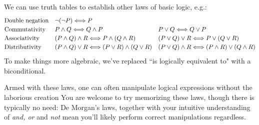 \begin{aside}{}{}
	\label{pg:asidelogicalgebra}
	
	We can use truth tables to establish other laws of basic logic, e.g.:
	\[
		\def\arraystretch{1.2}
		\begin{array}{@{}lll@{}}
			\text{Double negation} & \neg(\neg P)\Longleftrightarrow P &\\
			\text{Commutativity} & P\wedge Q\Longleftrightarrow Q\wedge P & P\vee Q\Longleftrightarrow Q\vee P\\
			\text{Associativity} & (P\wedge Q)\wedge R\Longleftrightarrow P\wedge(Q\wedge R) & (P\vee Q)\vee R\Longleftrightarrow P\vee(Q\vee R)\\
			\text{Distributivity}&(P\wedge Q)\vee R\Longleftrightarrow (P\vee R)\wedge (Q\vee R) & (P\vee Q)\wedge R\Longleftrightarrow (P\wedge R)\vee (Q\wedge R)
		\end{array}
	\]
	To make things more algebraic, we've replaced ``is logically equivalent to" with a biconditional.\footnotemark{}\smallbreak
	
	Armed with these laws, one can often manipulate logical expressions without the laborious creation You are welcome to try memorizing these laws, though there is typically no need: De Morgan's laws, together with your intuitive understanding of \emph{and, or} and \emph{not} mean you'll likely perform correct manipulations regardless.
\end{aside}






